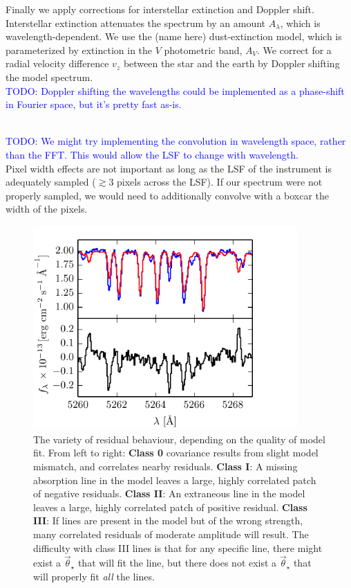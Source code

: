 \documentclass[iop,floatfix]{emulateapj}
\newcommand{\vt}{\vec{\theta}}
\newcommand{\vstar}{\vt_{\star}}
\newcommand{\todo}[1]{ \textcolor{Blue}{\\TODO: #1}}
\begin{document}
Finally we apply corrections for interstellar extinction and Doppler shift.
Interstellar extinction attenuates the spectrum by an amount $A_\lambda$, which
is wavelength-dependent. 
We use the (name here) dust-extinction model, which is parameterized by
 extinction in the $V$ photometric band, $A_V$. 
We correct for a radial velocity difference $v_z$ between the star and the
 earth by Doppler shifting the model spectrum. 
\todo{Doppler shifting the wavelengths could be implemented as a phase-shift in
 Fourier space, but it's pretty fast as-is.}

\todo{We might try implementing the convolution in wavelength space, rather
 than the FFT. 
This would allow the LSF to change with wavelength.\\} 
Pixel width effects are not important as long as the LSF of the instrument is
 adequately sampled ($\gtrsim 3$ pixels across the LSF). 
If our spectrum were not properly sampled, we would need to additionally
 convolve with a boxcar the width of the pixels.

\begin{figure}[!htb]
\begin{center}
  \includegraphics[width=0.9\textwidth]{figs/badlines}
  \caption{The variety of residual behaviour, depending on the quality of model
    fit. 
    From left to right: \textbf{Class 0} covariance results from slight
     model mismatch, and correlates nearby residuals. 
    \textbf{Class I}: A missing absorption line in the model leaves a large,
     highly correlated patch of negative residuals. 
    \textbf{Class II}: An extraneous line in the model leaves a large, highly
     correlated patch of positive residual.  
    \textbf{Class III}: If lines are present in the model but of the wrong
     strength, many correlated residuals of moderate amplitude will result. 
    The difficulty with class III lines is that for any specific line, there might
     exist a $\vstar$ that will fit the line, but there does not exist a
     $\vstar$ that will properly fit \emph{all} the lines.}
\label{fig:badlines}
\end{center}
\end{figure}
\end{document}
